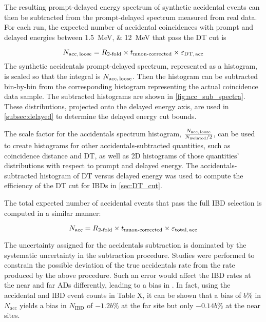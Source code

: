 The resulting prompt-delayed energy spectrum of synthetic accidental events
can then be subtracted
from the prompt-delayed spectrum measured from real data.
For each run, the expected number of accidental coincidences
with prompt and delayed energies between \SIlist{1.5;12}{\MeV}
that pass the DT cut is

\begin{equation}
    N_{\text{acc,\,loose}} = R_{\text{\ensuremath{2}-fold}} \times t_{\text{muon-corrected}}
        \times \varepsilon_{\text{DT,\,acc}}
    \label{eq:nacc_loose}
\end{equation}
The synthetic accidentals prompt-delayed spectrum, represented as a histogram,
is scaled so that the integral is $N_{\text{acc,\,loose}}$.
Then the histogram can be subtracted bin-by-bin from the corresponding histogram
representing the actual  coincidence data sample.
The subtracted histograms are shown in \cref{fig:acc_sub_spectra}.
These distributions, projected onto the delayed energy axis,
are used in \cref{subsec:delayed} to determine the delayed energy cut bounds.


The scale factor for the accidentals spectrum histogram,
$\frac{N_{\text{acc,\,loose}}}{N_{\text{isolated}}/2}$,
can be used to create histograms for other accidentals-subtracted quantities,
such as coincidence distance and DT, as well as 2D histograms of
those quantities' distributions with respect to prompt and delayed energy.
The accidentals-subtracted histogram of DT versus delayed energy
was used to compute the efficiency of the DT cut for IBDs in \cref{sec:DT_cut}.

The total expected number of accidental events
that pass the full IBD selection is computed in a similar manner:

\begin{equation}
    N_{\text{acc}} = R_{\text{\ensuremath{2}-fold}} \times t_{\text{muon-corrected}}
        \times \varepsilon_{\text{total,\,acc}}
    \label{eq:nacc}
\end{equation}

The uncertainty assigned for the accidentals subtraction
is dominated by the systematic uncertainty in the subtraction procedure.
Studies were performed to constrain the possible deviation
of the true accidentals rate
from the rate produced by the above procedure.
Such an error would affect the IBD rates at the near and far ADs differently,
leading to a bias in \thetaot{}.
In fact, using the accidental and IBD event counts in Table X,
it can be shown that a bias of $b\si{\percent}$ in $N_{\text{acc}}$
yields a bias in $N_{\text{IBD}}$ of $-1.2b\si{\percent}$ at the far site
but only $-0.14b\si{\percent}$ at the near sites.

